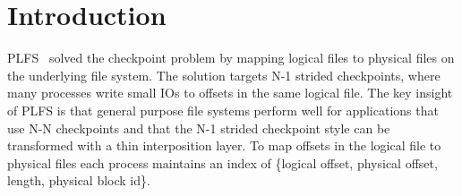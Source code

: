 \section{Introduction}
\label{sec:introduction}

PLFS~\cite{bent_plfs_2009} solved the checkpoint problem by mapping logical
files to physical files on the underlying file system. The solution targets N-1
strided checkpoints, where many processes write small IOs to offsets in the
same logical file. The key insight of PLFS is that general purpose file systems
perform well for applications that use N-N checkpoints and that the N-1 strided
checkpoint style can be transformed with a thin interposition layer. To map
offsets in the logical file to physical files each process maintains an index
of \{logical offset, physical offset, length, physical block id\}. 


